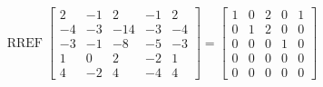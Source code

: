 \begin{exerciseAnswer} 


\[\operatorname{RREF} \left[\begin{array}{ccccc}
2 & -1 & 2 & -1 & 2 \\
-4 & -3 & -14 & -3 & -4 \\
-3 & -1 & -8 & -5 & -3 \\
1 & 0 & 2 & -2 & 1 \\
4 & -2 & 4 & -4 & 4
\end{array}\right] = \left[\begin{array}{ccccc}
1 & 0 & 2 & 0 & 1 \\
0 & 1 & 2 & 0 & 0 \\
0 & 0 & 0 & 1 & 0 \\
0 & 0 & 0 & 0 & 0 \\
0 & 0 & 0 & 0 & 0
\end{array}\right] \]



\end{exerciseAnswer}
